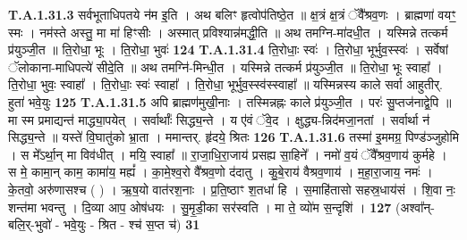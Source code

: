 \documentclass[17pt]{extarticle}
\begin{document}
                  \newline
                                                                  \textbf{ T.A.1.31.3} \newline
                  सर्वभूताधिपतये न॑म इ॒ति । अथ बलिꣳ हृत्वोप॑तिष्ठे॒त ॥ क्ष॒त्रं क्ष॒त्रं ॅवै᳚श्रव॒णः । ब्राह्मणा॑ वयꣳ॒॒ स्मः ।  नम॑स्ते अस्तु॒ मा मा॑ हिꣳसीः । अस्मात् प्रविश्यान्न॑मद्धी॒ति ॥ अथ तमग्नि-मा॑दधी॒त । यस्मिन्ने तत्कर्म प्र॑युञ्जी॒त ॥  ति॒रोधा॒ भूः । ति॒रोधा॒ भुवः॑ \textbf{ 124} \newline
                  \newline
                                                                  \textbf{ T.A.1.31.4} \newline
                  ति॒रोधाः॒ स्वः॑ । ति॒रोधा॒ भूर्भुव॒स्स्वः॑ ।  सर्वेषां ॅलोकाना-माधिपत्ये॑ सीदे॒ति ॥ अथ तमग्नि॑-मिन्धी॒त । यस्मिन्ने तत्कर्म प्र॑युञ्जी॒त ॥ ति॒रोधा॒ भूः स्वाहा᳚ । ति॒रोधा॒ भुवः॒ स्वाहा᳚ । ति॒रोधाः॒ स्वः॑ स्वाहा᳚ । ति॒रोधा॒ भूर्भुव॒स्स्व॑स्स्वाहा᳚ ॥  यस्मिन्नस्य काले सर्वा आहुतीर्. हुता॑ भवे॒युः \textbf{ 125} \newline
                  \newline
                                                                  \textbf{ T.A.1.31.5} \newline
                  अपि ब्राह्मण॑मुखी॒नाः । तस्मिन्नह्नः काले प्र॑युञ्जी॒त ।  परः॑ सु॒प्तज॑नाद्वे॒पि ॥ मा स्म प्रमाद्यन्त॑ माद्ध्या॒पयेत् । सर्वार्थाः᳚ सिद्ध्य॒न्ते । य ए॑वं ॅवे॒द । क्षुद्ध्य-न्निद॑मजा॒नतां ।  सर्वार्था न॑ सिद्ध्य॒न्ते ॥ यस्ते॑ वि॒घातु॑को भ्रा॒ता ।  ममान्तर्. हृ॑दये॒ श्रितः \textbf{ 126} \newline
                  \newline
                                                                  \textbf{ T.A.1.31.6} \newline
                  तस्मा॑ इ॒ममग्र॒ पिण्ड॑ञ्जुहोमि । स मे᳚ऽर्था॒न् मा विव॑धीत् । मयि॒ स्वाहा᳚ ॥ रा॒जा॒धि॒रा॒जाय॑ प्रसह्य सा॒हिने᳚ । नमो॑ व॒यं ॅवै᳚श्रव॒णाय॑ कुर्महे ।  स मे॒ कामा॒न् काम॒ कामा॑य॒ मह्यं᳚ । का॒मे॒श्व॒रो वै᳚श्रव॒णो द॑दातु । कु॒बे॒राय॑ वैश्रव॒णाय॑ । म॒हा॒रा॒जाय॒ नमः॑ । के॒तवो॒ अरु॑णासश्च ( ) ।  ऋ॒ष॒यो वात॑रश॒नाः । प्र॒ति॒ष्ठाꣳ श॒तधा॑ हि ।  स॒माहि॑तासो सहस्र॒धाय॑सं । शि॒वा नः॒ शन्त॑मा भवन्तु । दि॒व्या आप॒ ओष॑धयः । सु॒मृ॒डी॒का सर॑स्वति । मा ते॒ व्यो॑म स॒न्दृशि॑ । \textbf{ 127} \newline
                  \newline
                                                        (अश्वा᳚न्-बलि॒र्-भुवो॑ - भवे॒युः - श्रित - श्च॑ स॒प्त च॑) \textbf{31} \newline \newline
\end{document}
